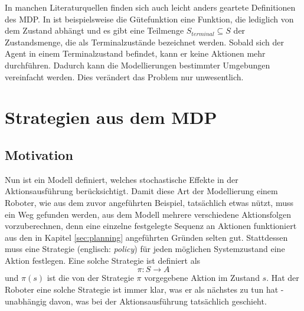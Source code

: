 \documentclass[a4paper]{IEEEtran}
\begin{document}
In manchen Literaturquellen finden sich auch leicht anders geartete Definitionen des MDP. In \cite{russell1995artificial} ist beispielsweise die Gütefunktion eine Funktion, die lediglich von dem Zustand abhängt und es gibt eine Teilmenge $S_{terminal} \subseteq S$ der Zustandsmenge, die als Terminalzustände bezeichnet werden. Sobald sich der Agent in einem Terminalzustand befindet, kann er keine Aktionen mehr durchführen. Dadurch kann die Modellierungen bestimmter Umgebungen vereinfacht werden. Dies verändert das Problem nur unwesentlich.


\section{Strategien aus dem MDP}
\subsection{Motivation}
Nun ist ein Modell definiert, welches stochastische Effekte in der Aktionsausführung berücksichtigt. Damit diese Art der Modellierung einem Roboter, wie aus dem zuvor angeführten Beispiel, tatsächlich etwas nützt, muss ein Weg gefunden werden, aus dem Modell mehrere verschiedene Aktionsfolgen vorzuberechnen, denn eine einzelne festgelegte Sequenz an Aktionen funktioniert aus den in Kapitel \ref{sec:planning} angeführten Gründen selten gut. Stattdessen muss eine Strategie (englisch: \emph{policy}) für jeden möglichen Systemzustand eine Aktion festlegen. Eine solche Strategie ist definiert als
\begin{equation}
	\pi:S \rightarrow A
	\label{eq:policy}
\end{equation}
und $\pi(s)$ ist die von der Strategie $\pi$ vorgegebene Aktion im Zustand $s$. Hat der Roboter eine solche Strategie ist immer klar, was er als nächstes zu tun hat - unabhängig davon, was bei der Aktionsausführung tatsächlich geschieht.
\end{document}
